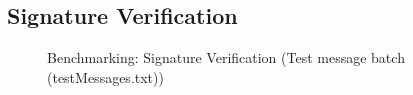 \documentclass[]{final_report}
\begin{document}
\subsection{Signature Verification}


\begin{figure}[H]
    \centering %
    
    \begin{minipage}{0.4\textwidth}
        \centering
       \caption{Benchmarking: Signature Verification (Test message batch (testMessages.txt))}
        \label{fig:image1}
    \end{minipage}
    \hfill %
    \begin{minipage}{0.58\textwidth}
        \centering

\end{minipage}
\end{figure}
\end{document}
